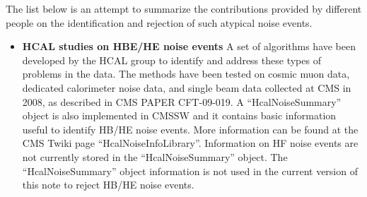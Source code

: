 The list below is an attempt to summarize the 
contributions provided by different people on the identification and rejection of such atypical noise events. 

\begin{itemize}

\item{\bf HCAL studies on HBE/HE noise events} A set of algorithms have been developed by the HCAL group to 
identify and address these types of problems in the data. The methods have been tested on cosmic muon data, 
dedicated calorimeter noise data, and single beam data collected at CMS in 2008, 
as described in CMS PAPER CFT-09-019. A ``HcalNoiseSummary'' object 
is also implemented in CMSSW and it contains basic information useful to identify HB/HE noise events.
More information can be found at 
the CMS Twiki page ``HcalNoiseInfoLibrary''.
Information on HF noise events are not currently stored in the ``HcalNoiseSummary'' object.
The ``HcalNoiseSummary'' object information is not used in the current version of this note
to reject HB/HE noise events.


\end{itemize}

